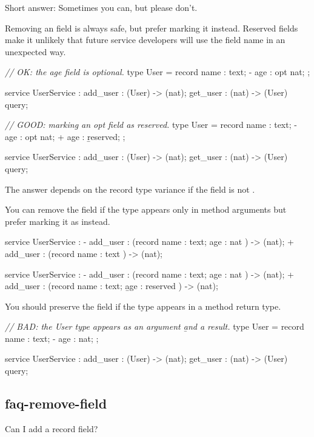 \documentclass{article}
\begin{document}
Short answer: Sometimes you can, but please don't.

Removing an  field is always safe, but prefer marking it  instead.
Reserved fields make it unlikely that future service developers will use the field name in an unexpected way.

\begin{code}[good]
\emph{// OK: the age field is optional.}
 type User = record {
   name : text;
-  age : opt nat;
 };

 service UserService : {
  add_user : (User) -> (nat);
  get_user : (nat) -> (User) query;
 }
\end{code}

\begin{code}[good]
\emph{// GOOD: marking an opt field as reserved.}
 type User = record {
   name : text;
-  age : opt nat;
+  age : \b{reserved};
 };

 service UserService : {
  add_user : (User) -> (nat);
  get_user : (nat) -> (User) query;
 }
\end{code}

The answer depends on the record type variance if the field is not .

You can remove the field if the type appears only in method arguments but prefer marking it as  instead.

\begin{code}[good]
 service UserService : {
-  add_user : (record { name : text;  age : nat }) -> (nat);
+  add_user : (record { name : text             }) -> (nat);
 }
\end{code}

\begin{code}[good]
 service UserService : {
-  add_user : (record { name : text; age : nat      }) -> (nat);
+  add_user : (record { name : text; \b{age : reserved} }) -> (nat);
 }
\end{code}

You should preserve the field if the type appears in a method return type.

\begin{code}[bad]
\emph{// BAD: the User type appears as an argument \b{and} a result.}
 type User = record {
   name : text;
-  age : nat;
};

 service UserService : {
  add_user : (User) -> (nat);
  get_user : (nat) -> (User) query;
 }
\end{code}

\subsection{faq-remove-field}{Can I add a record field?}
\end{document}
